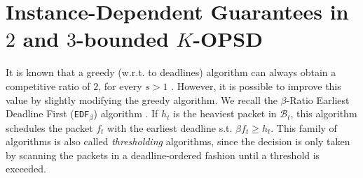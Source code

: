 \section{Instance-Dependent Guarantees in $2$ and $3$-bounded $K$-OPSD} 
It is known that a greedy (w.r.t. to deadlines) algorithm can always obtain a competitive ratio of $2$, for every $s>1$  \cite{hajek2001competitiveness}. However, it is possible to improve this value by slightly modifying the greedy algorithm. We recall the $\beta$-Ratio Earliest Deadline First (\texttt{EDF}$_\beta$) algorithm \citep{kesselman2001buffer}. If $h_t$ is the heaviest packet in $\mathcal{B}_t$, this algorithm schedules the packet $f_t$ with the earliest deadline s.t. $\beta f_t \ge h_t$. This family of algorithms is also called \textit{thresholding} algorithms, since the decision is only taken by scanning the packets in a deadline-ordered fashion until a threshold is exceeded. 

